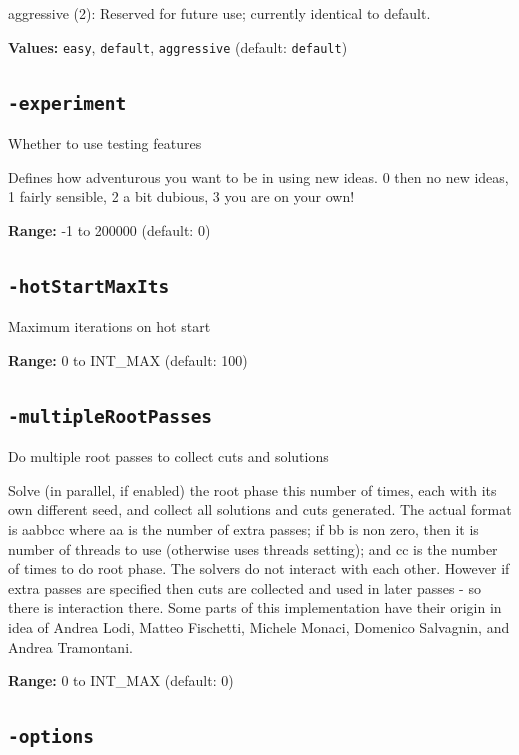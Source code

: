\documentclass[11pt,a4paper]{article}
\begin{document}
  aggressive (2): Reserved for future use; currently identical to default.

\textbf{Values:} \texttt{easy}, \texttt{default}, \texttt{aggressive} (default: \texttt{default})

\subsection*{\texttt{-experiment}}

Whether to use testing features

Defines how adventurous you want to be in using new ideas. 0 then no new ideas, 1 fairly sensible, 2 a bit dubious, 3 you are on your own!

\textbf{Range:} -1 to 200000 (default: 0)

\subsection*{\texttt{-hotStartMaxIts}}

Maximum iterations on hot start

\textbf{Range:} 0 to INT\_MAX (default: 100)

\subsection*{\texttt{-multipleRootPasses}}

Do multiple root passes to collect cuts and solutions

Solve (in parallel, if enabled) the root phase this number of times, each with its own different seed, and collect all solutions and cuts generated. The actual format is aabbcc where aa is the number of extra passes; if bb is non zero, then it is number of threads to use (otherwise uses threads setting); and cc is the number of times to do root phase. The solvers do not interact with each other.  However if extra passes are specified then cuts are collected and used in later passes - so there is interaction there. Some parts of this implementation have their origin in idea of Andrea Lodi, Matteo Fischetti, Michele Monaci, Domenico Salvagnin, and Andrea Tramontani.

\textbf{Range:} 0 to INT\_MAX (default: 0)

\subsection*{\texttt{-options}}
\end{document}

